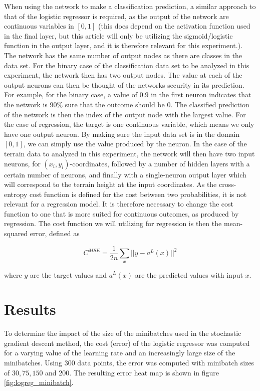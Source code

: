 \documentclass[a4paper,10pt,english]{article}
\begin{document}
When using the network to make a classification prediction, a similar approach to that of the logistic regressor is required, as the output of the network are continuous variables in $[0, 1]$ (this does depend on the activation function used in the final layer, but this article will only be utilizing the sigmoid/logistic function in the output layer, and it is therefore relevant for this experiment.). The network has the same number of output nodes as there are classes in the data set. For the binary case of the classification data set to be analyzed in this experiment, the network then has two output nodes. The value at each of the output neurons can then be thought of the networks security in its prediction. For example, for the binary case, a value of $0.9$ in the first neuron indicates that the network is 90\% sure that the outcome should be 0. The classified prediction of the network is then the index of the output node with the largest value. For the case of regression, the target is one continuous variable, which means we only have one output neuron. By making sure the input data set is in the domain $[0, 1]$, we can simply use the value produced by the neuron. In the case of the terrain data to analyzed in this experiment, the network will then have two input neurons, for $(x_i, y_i)$-coordinates, followed by a number of hidden layers with a certain number of neurons, and finally with a single-neuron output layer which will correspond to the terrain height at the input coordinates. As the cross-entropy cost function is defined for the cost between two probabilities, it is not relevant for a regression model. It is therefore necessary to change the cost function to one that is more suited for continuous outcomes, as produced by regression. The cost function we will utilizing for regression is then the mean-squared error, defined as

$$C^{MSE} = \frac{1}{2n} \sum_x ||y - a^L(x)||^2$$

where $y$ are the target values and $a^L(x)$ are the predicted values with input $x$. 


\section{Results}

To determine the impact of the size of the minibatches used in the stochastic gradient descent method, the cost (error) of the logistic regressor was computed for a varying value of the learning rate and an increasingly large size of the minibatches. Using 300 data points, the error was computed with minibatch sizes of $30, 75, 150$ and $200$. The resulting error heat map is shown in figure \ref{fig:logreg_minibatch}.
\end{document}
